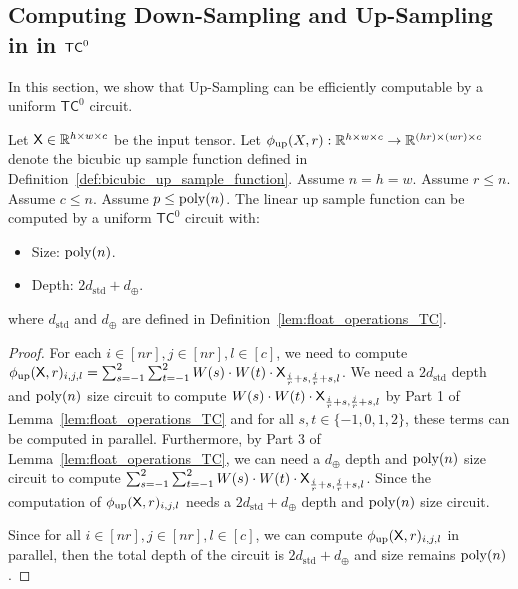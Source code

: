 \subsection{Computing Down-Sampling and Up-Sampling in in \texorpdfstring{$\mathsf{TC}^0$}{}}\label{sec:down_up_tc0}
In this section, we show that Up-Sampling can be efficiently computable by a uniform $\mathsf{TC}^0$ circuit.
\begin{lemma}\label{lem:up_tc0}
     Let $\mathsf{X} \in \mathbb{R}^{h \times w \times c}$ be the input tensor. Let $\phi_{\mathrm{up}}(X,r):\mathbb{R}^{h \times w \times c} \to \mathbb{R}^{(hr) \times (wr) \times c}$ denote the bicubic up sample function defined in Definition~\ref{def:bicubic_up_sample_function}. Assume $n = h = w$. Assume $r \leq n$. Assume $c \leq n$. Assume $p \leq \operatorname{poly}(n)$.
    The linear up sample function can be computed by a uniform $\mathsf{TC}^0$ circuit with:
    \begin{itemize}
        \item Size: $\operatorname{poly}(n)$.
        \item Depth: $2d_\mathrm{std} + d_{\oplus}$.
    \end{itemize}
    where $d_{\mathrm{std}}$ and $d_{\oplus}$ are defined in Definition~\ref{lem:float_operations_TC}.
\end{lemma}
\begin{proof}
    For each $i \in [nr], j \in [nr], l \in [c]$, we need to compute $\phi_{\mathrm{up}}(\mathsf{X},r)_{i,j,l} = \sum_{s=-1}^2 \sum_{t=-1}^2 W(s)\cdot W(t)\cdot \mathsf{X}_{\frac{i}{r}+s,\frac{j}{r}+s,l}$.  We need a $2d_{\mathrm{std}}$ depth and $\operatorname{poly}(n)$ size circuit to compute $W(s)\cdot W(t)\cdot \mathsf{X}_{\frac{i}{r}+s,\frac{j}{r}+s,l}$ by Part 1 of Lemma~\ref{lem:float_operations_TC} and for all $s,t \in \{-1,0,1,2\}$, these terms can be computed in parallel. Furthermore, by Part 3 of Lemma~\ref{lem:float_operations_TC}, we can need a $d_{\oplus}$ depth and $\operatorname{poly}(n)$ size circuit to compute $\sum_{s=-1}^2 \sum_{t=-1}^2 W(s)\cdot W(t)\cdot \mathsf{X}_{\frac{i}{r}+s,\frac{j}{r}+s,l}$. Since the computation of $\phi_{\mathrm{up}}(\mathsf{X},r)_{i,j,l}$ needs a $2d_{\mathrm{std}}+d_{\oplus}$ depth and $\operatorname{poly}(n)$ size circuit.

    Since for all $i \in [nr], j \in [nr], l \in [c]$, we can compute $\phi_{\mathrm{up}}(\mathsf{X},r)_{i,j,l}$ in parallel, then the total depth of the circuit is $2d_{\mathrm{std}} + d_{\oplus}$ and size remains $\operatorname{poly}(n)$.
\end{proof}

